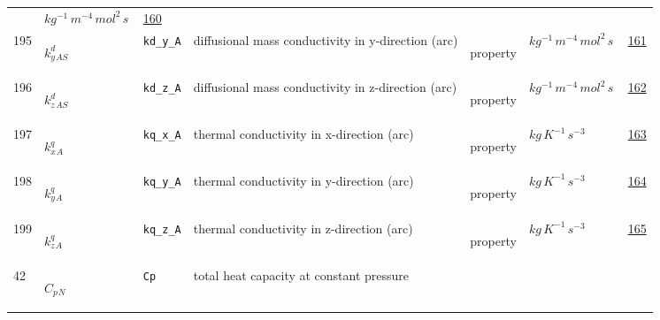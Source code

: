 \begin{longtable}{|p{1cm}|p{2.5cm}|p{4.5cm}|p{8cm}|p{3.0cm}|p{3cm}|p{1cm}|}
             & $ kg^{-1} \,m^{-4} \,mol^{2} \,s \, $
             &                 \hyperlink{"e:160"}{ 160 }
                 \\
            195
             & \hypertarget{"v:195"}{ $ {{k^d_y}}{_{{A S}}} $}
             & \verb|kd_y_A|
             & diffusional mass conductivity in y-direction (arc)
             & \begin{lay}property \end{lay}
             & $ kg^{-1} \,m^{-4} \,mol^{2} \,s \, $
             &                 \hyperlink{"e:161"}{ 161 }
                 \\
            196
             & \hypertarget{"v:196"}{ $ {{k^d_z}}{_{{A S}}} $}
             & \verb|kd_z_A|
             & diffusional mass conductivity in z-direction (arc)
             & \begin{lay}property \end{lay}
             & $ kg^{-1} \,m^{-4} \,mol^{2} \,s \, $
             &                 \hyperlink{"e:162"}{ 162 }
                 \\
            197
             & \hypertarget{"v:197"}{ $ {{k^q_x}}{_{A}} $}
             & \verb|kq_x_A|
             & thermal conductivity in x-direction (arc)
             & \begin{lay}property \end{lay}
             & $ kg \,K^{-1} \,s^{-3} \, $
             &                 \hyperlink{"e:163"}{ 163 }
                 \\
            198
             & \hypertarget{"v:198"}{ $ {{k^q_y}}{_{A}} $}
             & \verb|kq_y_A|
             & thermal conductivity in y-direction (arc)
             & \begin{lay}property \end{lay}
             & $ kg \,K^{-1} \,s^{-3} \, $
             &                 \hyperlink{"e:164"}{ 164 }
                 \\
            199
             & \hypertarget{"v:199"}{ $ {{k^q_z}}{_{A}} $}
             & \verb|kq_z_A|
             & thermal conductivity in z-direction (arc)
             & \begin{lay}property \end{lay}
             & $ kg \,K^{-1} \,s^{-3} \, $
             &                 \hyperlink{"e:165"}{ 165 }
                 \\
            42
             & \hypertarget{"v:42"}{ $ {{C_p}}{_{N}} $}
             & \verb|Cp|
             & total heat capacity at constant pressure

\end{longtable}
